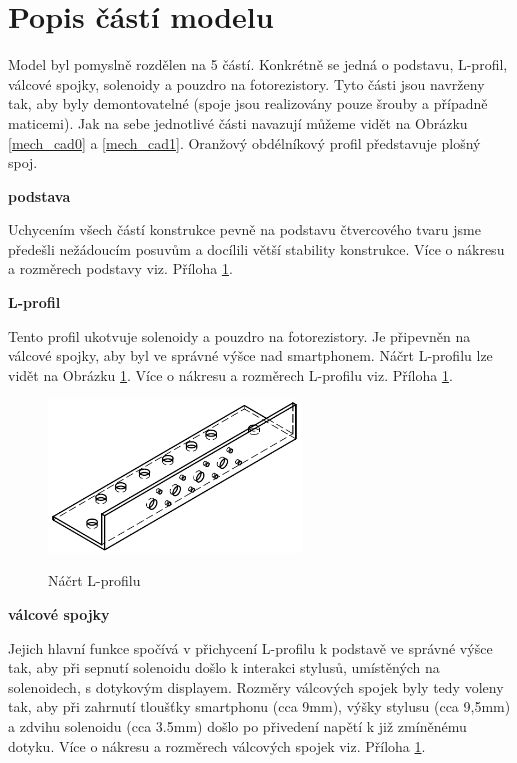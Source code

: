 \documentclass[12pt,oneside]{book} %
\begin{document}
\pagebreak

\section{Popis částí modelu}\label{mech_casti}
\qquad Model byl pomyslně rozdělen na 5 částí. Konkrétně se jedná o podstavu, L-profil, válcové spojky, solenoidy a pouzdro na fotorezistory. Tyto části jsou navrženy tak, aby byly demontovatelné (spoje jsou realizovány pouze šrouby a případně maticemi). Jak na sebe jednotlivé části navazují můžeme vidět na Obrázku \ref{mech_cad0} a \ref{mech_cad1}. Oranžový obdélníkový profil představuje plošný spoj.

\textbf{podstava}

\qquad Uchycením všech částí konstrukce pevně na podstavu čtvercového tvaru jsme předešli nežádoucím posuvům a docílili větší stability konstrukce. Více o nákresu a rozměrech podstavy viz. Příloha \hyperref[Prilohy]{1}.

\textbf{L-profil}

\qquad Tento profil ukotvuje solenoidy a pouzdro na fotorezistory. Je připevněn na válcové spojky, aby byl ve správné výšce nad smartphonem. Náčrt L-profilu lze vidět na Obrázku \ref{lprof}. Více o nákresu a rozměrech L-profilu viz. Příloha \hyperref[Prilohy]{1}.  

\begin{figure}[ht] \large\centering
\includegraphics[width=0.60\textwidth]{./img/lprof.png}\\[1cm] 
\caption{Náčrt L-profilu}
\label{lprof}
\end{figure}   

\textbf{válcové spojky}

\qquad Jejich hlavní funkce spočívá v přichycení L-profilu k podstavě ve správné výšce tak, aby při sepnutí solenoidu došlo k interakci stylusů, umístěných na solenoidech, s dotykovým displayem. Rozměry válcových spojek byly tedy voleny tak, aby při zahrnutí tloušťky smartphonu (cca 9mm), výšky stylusu (cca 9,5mm) a zdvihu solenoidu (cca 3.5mm) došlo po přivedení napětí k již zmíněnému dotyku.  Více o nákresu a rozměrech válcových spojek viz. Příloha \hyperref[Prilohy]{1}.
\end{document}
